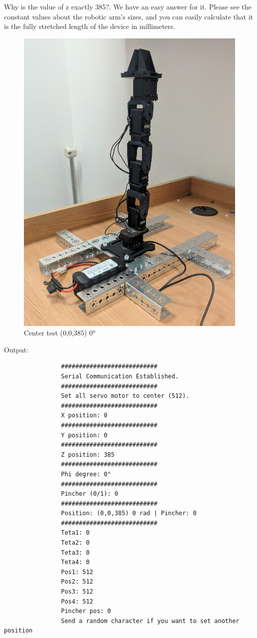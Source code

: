 			Why is the value of z exactly 385?. We have an easy answer for it. Please see the constant values about the robotic arm’s sizes, and you can easily calculate that it is the fully stretched length of the device in millimeters.
		
			\begin{figure}[H]
				\centering
				\includegraphics[scale=0.11]{./images/test_center}
				\caption{Center test (0,0,385) 0°}
			\end{figure}
			
			Output:
			
			\begin{verbatim}
				###########################
				Serial Communication Established.
				###########################
				Set all servo motor to center (512).
				###########################
				X position: 0
				###########################
				Y position: 0
				###########################
				Z position: 385
				###########################
				Phi degree: 0°
				###########################
				Pincher (0/1): 0
				###########################
				Position: (0,0,385) 0 rad | Pincher: 0
				###########################
				Teta1: 0
				Teta2: 0
				Teta3: 0
				Teta4: 0
				Pos1: 512
				Pos2: 512
				Pos3: 512
				Pos4: 512
				Pincher pos: 0
				Send a random character if you want to set another position
			\end{verbatim}
			
